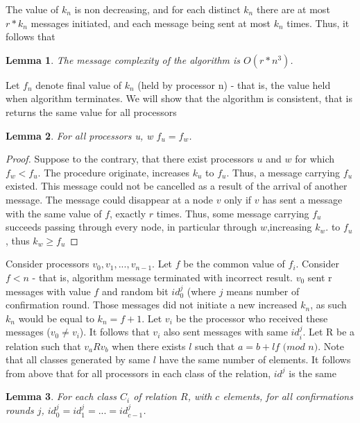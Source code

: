 \documentclass{article}
\newtheorem{lemma}{Lemma}
\begin{document}
The value of $k_n$ is non decreasing, and for each distinct $k_n$ there are at most $r*k_n$ messages initiated, and each message being sent at most $k_n$ times. Thus, it follows that

\begin{lemma}
The message complexity of the algorithm is $O(r*n^3)$.
\end{lemma}

Let $f_n$ denote final value of $k_n$ (held by processor n) - that is, the value held when algorithm terminates. We will show that the algorithm is consistent, that is returns the same value for all processors

\begin{lemma}
For all processors u, w $f_u = f_w$.
\end{lemma}

\begin{proof} \cite{ItaiRodeh1990}
Suppose to the contrary, that there exist processors $u$ and $w$ for
which $f_w < f_u$. The procedure originate, increases $k_u$ to $f_u$. Thus, a message carrying $f_u$ existed. This message could not be cancelled as a result of the arrival of another message. The message could disappear at a node $v$ only if $v$ has sent a message with the same value of $f$, exactly $r$ times. Thus, some message carrying $f_u$ succeeds passing through every node, in particular through $w$,increasing $k_w$. to $f_u$, thus $k_w \geq f_u$
\end{proof}

Consider processors $v_0, v_1, ..., v_{n-1}$. Let $f$ be the common value of $f_i$. Consider $f < n$ - that is, algorithm message terminated with incorrect result. $v_0$ sent r messages with value $f$ and random bit $id^j_0$ (where $j$ means number of confirmation round. Those messages did not initiate a new increased $k_n$, as such $k_n$ would be equal to $k_n = f + 1$. Let $v_i$ be the processor who received these messages ($v_0 \neq v_i$). It follows that $v_i$ also sent messages with same $id^j_i$. Let R be a relation such that $v_a R v_b$ when there exists $l$ such that $a = b + l f$  $(mod$ $n)$. Note that all classes generated by same $l$ have the same number of elements. It follows from above that for all processors in each class of the relation, $id^j$ is the same

\begin{lemma}
For each class $C_i$ of relation $R$, with $c$ elements, for all confirmations rounds $j$, $id^j_0 = id^j_1 = ... = id^j_{c-1}$.
\end{lemma}
\end{document}

